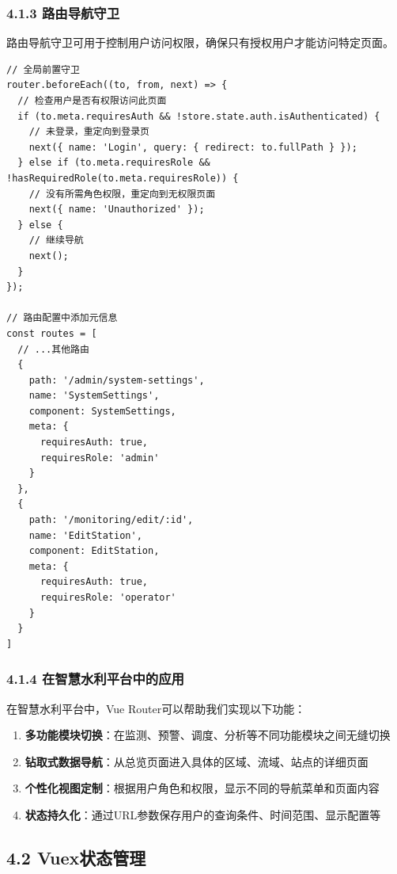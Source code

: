 \subsubsection{4.1.3
路由导航守卫}\label{ux8defux7531ux5bfcux822aux5b88ux536b}

路由导航守卫可用于控制用户访问权限，确保只有授权用户才能访问特定页面。

\begin{lstlisting}
// 全局前置守卫
router.beforeEach((to, from, next) => {
  // 检查用户是否有权限访问此页面
  if (to.meta.requiresAuth && !store.state.auth.isAuthenticated) {
    // 未登录，重定向到登录页
    next({ name: 'Login', query: { redirect: to.fullPath } });
  } else if (to.meta.requiresRole && !hasRequiredRole(to.meta.requiresRole)) {
    // 没有所需角色权限，重定向到无权限页面
    next({ name: 'Unauthorized' });
  } else {
    // 继续导航
    next();
  }
});

// 路由配置中添加元信息
const routes = [
  // ...其他路由
  {
    path: '/admin/system-settings',
    name: 'SystemSettings',
    component: SystemSettings,
    meta: { 
      requiresAuth: true,
      requiresRole: 'admin'
    }
  },
  {
    path: '/monitoring/edit/:id',
    name: 'EditStation',
    component: EditStation,
    meta: { 
      requiresAuth: true,
      requiresRole: 'operator'
    }
  }
]
\end{lstlisting}

\subsubsection{4.1.4
在智慧水利平台中的应用}\label{ux5728ux667aux6167ux6c34ux5229ux5e73ux53f0ux4e2dux7684ux5e94ux7528}

在智慧水利平台中，Vue Router可以帮助我们实现以下功能：

\begin{enumerate}
\def\labelenumi{\arabic{enumi}.}
\tightlist
\item
  \textbf{多功能模块切换}：在监测、预警、调度、分析等不同功能模块之间无缝切换
\item
  \textbf{钻取式数据导航}：从总览页面进入具体的区域、流域、站点的详细页面
\item
  \textbf{个性化视图定制}：根据用户角色和权限，显示不同的导航菜单和页面内容
\item
  \textbf{状态持久化}：通过URL参数保存用户的查询条件、时间范围、显示配置等
\end{enumerate}

\subsection{4.2 Vuex状态管理}\label{vuexux72b6ux6001ux7ba1ux7406}

